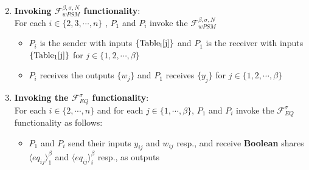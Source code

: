 \begin{frame}

    \begin{enumerate}
        \setcounter{enumi}{1}\item \textbf{Invoking $\mathcal{F}_{wPSM}^{\beta,\sigma,N}$ functionality}: \\
        For each $i \in \{2,3,\cdots,n\}$ , $P_1$ and $P_i$ invoke the $\mathcal{F}_{wPSM}^{\beta,\sigma,N}$
        \begin{itemize}
            \item $P_i$ is the sender with inputs $\{\rm{Table}_i[j]\}$ and $P_1$ is the receiver with inputs $\{\rm{Table}_1[j]\}$ for $j \in \{1,2,\cdots,\beta \}$
            \item $P_i$ receives the outputs $\{w_j\}$ and $P_1$ receives $\{y_j\}$ for $j \in \{1,2,\cdots,\beta \}$
        \end{itemize}

        \vspace{0.5cm}

        \item \textbf{Invoking the $\mathcal{F}^{\sigma}_{EQ}$ functionality}: \\
        For each $i \in \{2,\cdots,n \}$ and for each $j \in \{1,\cdots,\beta \}$, $P_1 $ and $P_i$ invoke the $\mathcal{F}^{\sigma}_{EQ}$ functionality as follows:
        \begin{itemize}
            \item $P_1$ and $P_i$ send their inputs $y_{ij}$ and $w_{ij}$ resp., and receive \textbf{Boolean} shares $\langle eq_{ij} \rangle_1^{\beta}$
            and $\langle eq_{ij} \rangle_i^{\beta}$ resp., as outputs
        \end{itemize}
    \end{enumerate}

\end{frame}

